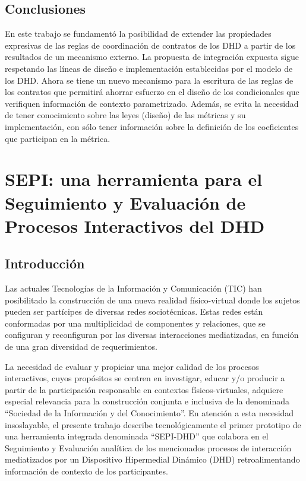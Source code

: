 \subsection{Conclusiones}

En este trabajo se fundamentó la posibilidad de extender las propiedades
expresivas de las reglas de coordinación de contratos de los DHD a partir de los
resultados de un mecanismo externo. La propuesta de integración expuesta sigue
respetando las líneas de diseño e implementación establecidas por el modelo de
los DHD. 
Ahora se tiene un nuevo mecanismo para la escritura de las reglas de los
contratos que permitirá ahorrar esfuerzo en el diseño de los condicionales que
verifiquen información de contexto parametrizado. Además, se evita la necesidad
de tener conocimiento sobre las leyes (diseño) de las métricas y su
implementación, con sólo tener información sobre la definición de los
coeficientes que participan en la métrica. 


\section{SEPI: una herramienta para el Seguimiento y Evaluación de
Procesos Interactivos del DHD}


\subsection{Introducción}

Las actuales Tecnologías de la Información y Comunicación (TIC) han posibilitado
la construcción de una nueva realidad físico-virtual donde los sujetos pueden
ser partícipes de diversas redes sociotécnicas. Estas redes están conformadas
por una multiplicidad de componentes y relaciones, que se configuran y
reconfiguran por las diversas interacciones mediatizadas, en función de una gran
diversidad de requerimientos.


La necesidad de evaluar y propiciar una mejor calidad de los procesos
interactivos, cuyos propósitos se centren en investigar, educar y/o producir a
partir de la participación responsable en contextos físicos-virtuales, adquiere
especial relevancia para la construcción conjunta e inclusiva de la denominada
“Sociedad de la Información y del Conocimiento”. En atención a esta necesidad
insoslayable, el presente trabajo describe tecnológicamente el primer prototipo
de una herramienta integrada denominada “SEPI-DHD” que colabora en el
Seguimiento y Evaluación analítica de los mencionados procesos de interacción
mediatizados por un Dispositivo Hipermedial Dinámico (DHD) retroalimentando
información de contexto de los participantes.


